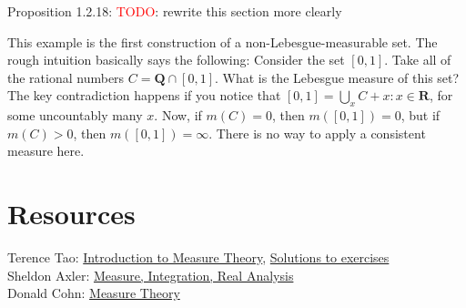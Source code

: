 \documentclass[answers,12pt]{exam}
\begin{document}
Proposition 1.2.18: \textcolor{red}{TODO}: rewrite this section more clearly

This example is the first construction of a non-Lebesgue-measurable set.
The rough intuition basically says the following:
Consider the set $[0,1]$.
Take all of the rational numbers $C =\mathbf{Q} \cap [0,1]$.
What is the Lebesgue measure of this set?
The key contradiction happens if you notice that $[0,1] = \bigcup_{x} C + x: x \in \mathbf{R}$, for some uncountably many $x$.
Now, if $m(C) = 0$, then $m([0,1])=0$, but if $m(C)>0$, then $m([0,1]) = \infty$. 
There is no way to apply a consistent measure here. 

\section{Resources}
Terence Tao: \href{https://terrytao.files.wordpress.com/2012/12/gsm-126-tao5-measure-book.pdf}{Introduction to Measure Theory}, \href{https://math.solverer.com/library/terence_tao/an_introduction_to_measure_theory}{Solutions to exercises}\\
Sheldon Axler: \href{https://measure.axler.net/MIRA.pdf}{Measure, Integration, Real Analysis}\\
Donald Cohn: \href{https://www.fayoum.edu.eg/stfsys/stfFiles/273/1342/Measure%20Theory%20(2nd%20ed.)%20-%20Cohn,%20Donald%20L._5990.pdf}{Measure Theory}
\end{document}
